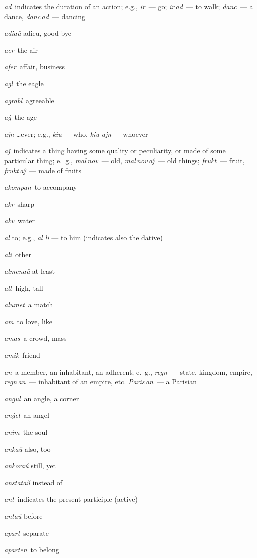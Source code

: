 \begin{landscape}
\begin{multicols}{5}
\begin{outdent}{1em}
\emph{ad\,} indicates the duration of an action; e.g., \emph{ir\,} — go; \emph{ir\,ad\,} — to walk; \emph{danc\,} — a dance, \emph{danc\,ad\,} — dancing

\emph{adiaŭ} adieu, good-bye

\emph{aer\,} the air

\emph{afer\,} affair, business

\emph{agl\,} the eagle

\emph{agrabl\,} agreeable

\emph{aĝ\,} the age

\emph{ajn} \ldots{}ever; e.g., \emph{kiu} — who, \emph{kiu ajn} — whoever

\emph{aĵ\,} indicates a thing having some quality or peculiarity, or made of some particular thing; e.~g., \emph{mal\,nov\,} — old, \emph{mal\,nov\,aĵ\,} — old things; \emph{frukt\,} — fruit, \emph{frukt\,aĵ\,} — made of fruits

\emph{akompan\,} to accompany

\emph{akr\,} sharp

\emph{akv\,} water

\emph{al} to; e.g., \emph{al li} — to him (indicates also the dative)

\emph{ali\,} other

\emph{almenaŭ} at least

\emph{alt\,} high, tall

\emph{alumet\,} a match

\emph{am\,} to love, like

\emph{amas\,} a crowd, mass

\emph{amik\,} friend

\emph{an\,} a member, an inhabitant, an adherent; e.~g., \emph{regn\,} — state, kingdom, empire, \emph{regn\,an\,} — inhabitant of an empire, etc. \emph{Paris\,an\,} — a Parisian

\emph{angul\,} an angle, a corner

\emph{anĝel\,} an angel

\emph{anim\,} the soul

\emph{ankaŭ} also, too

\emph{ankoraŭ} still, yet

\emph{anstataŭ} instead of

\emph{ant\,} indicates the present participle (active)

\emph{antaŭ} before

\emph{apart\,} separate

\emph{aparten\,} to belong


\end{outdent}
\end{multicols}
\end{landscape}
